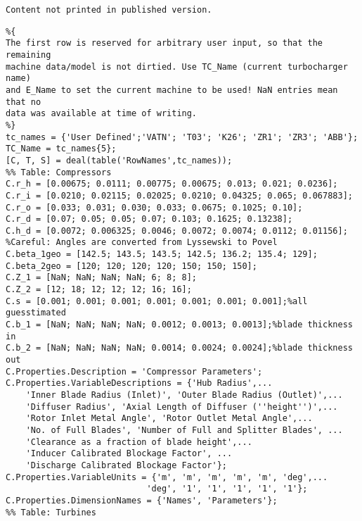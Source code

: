 \ifpublished
	\begin{lstlisting}[caption={[Geometry parameter tables]Tables holding geometry parameters, \iecfeg{cf.}\ \cref{ch:geometric_similitude,tab:turbine_geometry,tab:compressor_geometry}}, label={matlab:geometry_tables}]
		Content not printed in published version.
	\end{lstlisting}
\else
\begin{lstlisting}[caption={[Geometry parameter tables]Tables holding geometry parameters, \iecfeg{cf.}\ \cref{ch:geometric_similitude,tab:turbine_geometry,tab:compressor_geometry}}, label={matlab:geometry_tables}]
%% Machine Data Parameterization
%{
The first row is reserved for arbitrary user input, so that the remaining
machine data/model is not dirtied. Use TC_Name (current turbocharger name)
and E_Name to set the current machine to be used! NaN entries mean that no
data was available at time of writing.
%}
tc_names = {'User Defined';'VATN'; 'T03'; 'K26'; 'ZR1'; 'ZR3'; 'ABB'};            
TC_Name = tc_names{5};
[C, T, S] = deal(table('RowNames',tc_names));
%% Table: Compressors
C.r_h = [0.00675; 0.0111; 0.00775; 0.00675; 0.013; 0.021; 0.0236];
C.r_i = [0.0210; 0.02115; 0.02025; 0.0210; 0.04325; 0.065; 0.067883];
C.r_o = [0.033; 0.031; 0.030; 0.033; 0.0675; 0.1025; 0.10];
C.r_d = [0.07; 0.05; 0.05; 0.07; 0.103; 0.1625; 0.13238];
C.h_d = [0.0072; 0.006325; 0.0046; 0.0072; 0.0074; 0.0112; 0.01156];
%Careful: Angles are converted from Lyssewski to Povel
C.beta_1geo = [142.5; 143.5; 143.5; 142.5; 136.2; 135.4; 129];
C.beta_2geo = [120; 120; 120; 120; 150; 150; 150];
C.Z_1 = [NaN; NaN; NaN; NaN; 6; 8; 8];
C.Z_2 = [12; 18; 12; 12; 12; 16; 16];
C.s = [0.001; 0.001; 0.001; 0.001; 0.001; 0.001; 0.001];%all guesstimated
C.b_1 = [NaN; NaN; NaN; NaN; 0.0012; 0.0013; 0.0013];%blade thickness in
C.b_2 = [NaN; NaN; NaN; NaN; 0.0014; 0.0024; 0.0024];%blade thickness out
C.Properties.Description = 'Compressor Parameters';
C.Properties.VariableDescriptions = {'Hub Radius',...
    'Inner Blade Radius (Inlet)', 'Outer Blade Radius (Outlet)',...
    'Diffuser Radius', 'Axial Length of Diffuser (''height'')',...
    'Rotor Inlet Metal Angle', 'Rotor Outlet Metal Angle',...
    'No. of Full Blades', 'Number of Full and Splitter Blades', ...
    'Clearance as a fraction of blade height',...
    'Inducer Calibrated Blockage Factor', ...
    'Discharge Calibrated Blockage Factor'};
C.Properties.VariableUnits = {'m', 'm', 'm', 'm', 'm', 'deg',...
                            'deg', '1', '1', '1', '1', '1'};
C.Properties.DimensionNames = {'Names', 'Parameters'};
%% Table: Turbines

\end{lstlisting}
